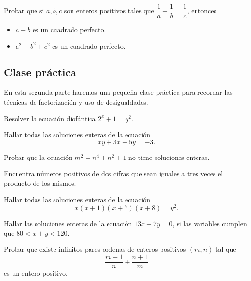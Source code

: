 \begin{problem}
    Probar que si $a,b,c$ son enteros positivos tales que $\dfrac{1}{a} + \dfrac{1}{b} = \dfrac{1}{c}$, entonces
    \begin{itemize}
        \item $a + b$ es un cuadrado perfecto.
        \item $a^2 + b^2 + c^2$ es un cuadrado perfecto.
    \end{itemize}
\end{problem}



\subsection{Clase práctica}

En esta segunda parte haremos una pequeña clase práctica para recordar las técnicas de factorización y uso de desigualdades.

\begin{exercise}
    Resolver la ecuación diofántica $2^x + 1 = y^2$.
\end{exercise}

\begin{exercise}
    Hallar todas las soluciones enteras de la ecuación
    \[
        xy + 3x - 5y = -3.
    \]
\end{exercise}

\begin{exercise}
    Probar que la ecuación $m^2 = n^4 + n^2 + 1$ no tiene soluciones enteras.
\end{exercise}

\begin{exercise}
    Encuentra números positivos de dos cifras que sean iguales a tres veces el producto de los mismos.
\end{exercise}

\begin{exercise}
    Hallar todas las soluciones enteras de la ecuación
    \[
        x(x + 1)(x + 7)(x + 8) = y^2.
    \]
\end{exercise}

\begin{exercise}
    Hallar las soluciones enteras de la ecuación $13x - 7y = 0$, si las variables cumplen que $80 < x + y < 120$.
\end{exercise}

\begin{exercise}
    Probar que existe infinitos pares ordenas de enteros positivos $(m,n)$ tal que
    \[
        \frac{m + 1}{n} + \frac{n + 1}{m}
    \]
    es un entero positivo.
\end{exercise}

